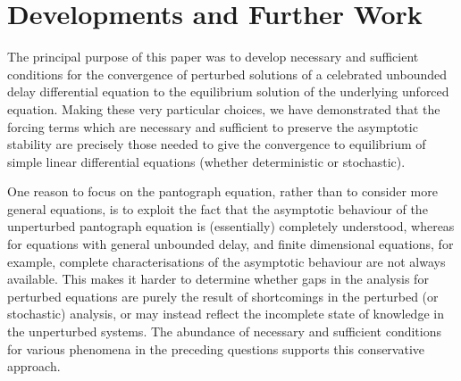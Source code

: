 \documentclass[a4paper,10pt,reqno]{amsart}
\numberwithin{equation}{section}
\theoremstyle{definition}
\theoremstyle{remark}
\DeclareMathOperator{\1}{\mathbbm 1}
\begin{document}
\vspace{-0.25in}

\section{Developments and Further Work}
The principal purpose of this paper was to develop necessary and sufficient conditions for the convergence of perturbed solutions of a celebrated unbounded delay differential equation to the  equilibrium solution of the underlying unforced equation. Making these very particular choices, we have demonstrated that the forcing terms which are necessary and sufficient to preserve the asymptotic stability are precisely those needed to give the convergence to equilibrium of simple linear differential equations (whether deterministic or stochastic). 

One reason to focus on the pantograph equation, rather than to consider more general equations, is to exploit the fact that the asymptotic behaviour of the unperturbed pantograph equation is (essentially) completely understood, whereas for equations with general unbounded delay, and finite dimensional equations, for example, complete characterisations of the asymptotic behaviour are not always available. This makes it harder to determine whether gaps in the analysis for perturbed equations are purely the result of shortcomings in the perturbed (or stochastic) analysis, or may instead reflect the incomplete state of knowledge in the unperturbed systems. The abundance of necessary and sufficient conditions for various phenomena in the preceding questions supports this conservative approach.   
\end{document}
